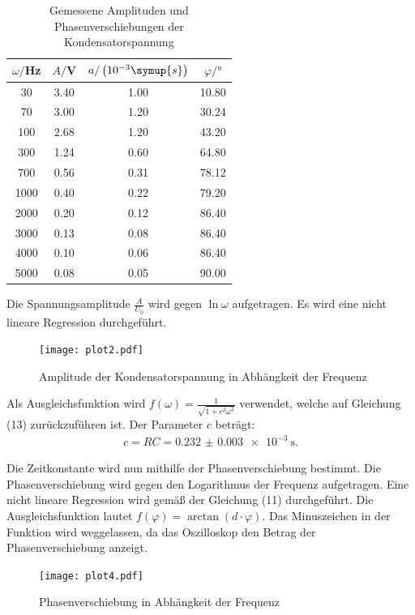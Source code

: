 \begin{table}[H]
  \centering
  \caption{Gemessene Amplituden und Phasenverschiebungen der Kondensatorspannung}
  \label{tab:amplitude}
  \begin{tabular}{c c c c}
    \toprule
    $\omega/$Hz & $A/$V & $a/\left(10^{-3}\symup{s}\right)$ & $\varphi /°$ \\
    \midrule
    30   &  3.40 &    1.00 &  10.80 \\
    70   &  3.00 &    1.20 &  30.24 \\
    100  &  2.68 &    1.20 &  43.20 \\
    300  &  1.24 &    0.60 &  64.80 \\
    700  &  0.56 &    0.31 &  78.12 \\
    1000 &  0.40 &    0.22 &  79.20 \\
    2000 &  0.20 &    0.12 &  86.40 \\
    3000 &  0.13 &    0.08 &  86.40 \\
    4000 &  0.10 &    0.06 &  86.40 \\
    5000 &  0.08 &    0.05 &  90.00 \\
    \bottomrule
  \end{tabular}
\end{table}

Die Spannungsamplitude $\frac{A}{U_0}$ wird gegen $\ln{\omega}$ aufgetragen. Es wird eine nicht lineare
Regression durchgeführt.

\begin{figure}[H]
  \centering
  \texttt{[image: plot2.pdf]}
  \caption{Amplitude der Kondensatorspannung in Abhängkeit der Frequenz}
  \label{fig:amplitude}
\end{figure}

Als Ausgleichsfunktion wird $f(\omega) = \frac{1}{\sqrt{1 + c^2 \omega^2}}$ verwendet, welche auf Gleichung (13)
zurückzuführen ist.
Der Parameter $c$ beträgt:
\begin{align*}
  c = RC = \SI{0.232(3)e-3}{\second}.
\end{align*}

Die Zeitkonstante wird nun mithilfe der Phasenverschiebung bestimmt. Die Phasenverschiebung wird gegen
den Logarithmus der Frequenz aufgetragen. Eine nicht lineare Regression wird gemäß der Gleichung (11) durchgeführt.
Die Ausgleichsfunktion lautet $f(\varphi) = \arctan(d \cdot \varphi)$. Das Minuszeichen in der Funktion wird
weggelassen, da das Oszilloskop den Betrag der Phasenverschiebung anzeigt.

\begin{figure}[H]
  \centering
  \texttt{[image: plot4.pdf]}
  \caption{Phasenverschiebung in Abhängkeit der Frequenz}
  \label{fig:phasenverschiebung}
\end{figure}


